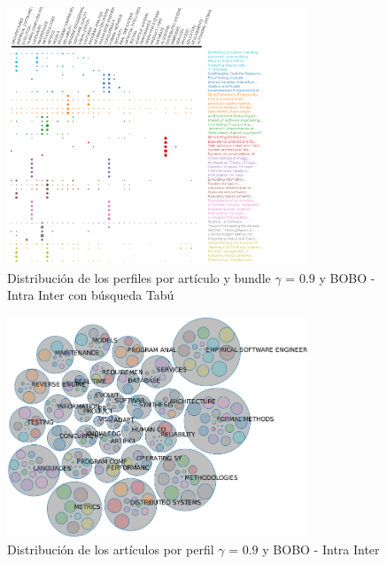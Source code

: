 \begin{figure}[H]
  \centering
    \includegraphics[width=0.8\textwidth]{resultados/papers/BOBO/INTRA_INTER/gamma-with-local-09.png}
  \caption{Distribución de los perfiles por artículo y bundle $\gamma$ = $0.9$ y BOBO - Intra Inter con búsqueda Tabú}
  \label{res:img-papers-gamma09-bobo-intra-inter-tabu}
\end{figure}

\begin{figure}[H]
  \centering
    \includegraphics[width=0.8\textwidth]{resultados/papers/BOBO/INTRA_INTER/bubbles-gamma-09.png}
  \caption{Distribución de los artículos por perfil $\gamma$ = $0.9$ y BOBO - Intra Inter}
  \label{res:img-papers-bubbles-gamma09-bobo-intra-inter}
\end{figure}

